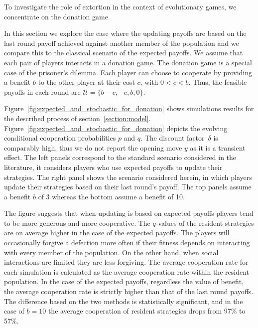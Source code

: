 \documentclass[11pt]{article}
\theoremstyle{plainCl1}
\theoremstyle{plainCl2}
\begin{document}
To investigate the role of extortion in the context of evolutionary games, we
concentrate on the donation game 

In this section we explore the case where the updating payoffs are based on the
last round payoff achieved against another member of the population and we
compare this to the classical scenario of the expected payoffs. We assume that
each pair of players interacts in a donation game. The donation game is a
special case of the prisoner's dilemma. Each player can choose to cooperate by
providing a benefit \(b\) to the other player at their cost \(c\), with \(0 < c
< b\). Thus, the feasible payoffs in each round are \(\mathcal{U} = \{b-c, -c,
b, 0\}\).

Figure~\ref{fig:expected_and_stochastic_for_donation} shows simulations results
for the described process of section~\ref{section:model}.
Figure~\ref{fig:expected_and_stochastic_for_donation} depicts the evolving
conditional cooperation probabilities $p$ and $q$. The discount factor~$\delta$
is comparably high, thus we do not report the opening move \(y\) as it is a
transient effect. The left panels correspond to the standard scenario considered
in the literature, it considers players who use expected payoffs to update their
strategies. The right panel shows the scenario considered herein, in which
players update their strategies based on their last round’s payoff. The top
panels assume a benefit \(b\) of 3 whereas the bottom assume a benefit of 10.

The figure suggests that when updating is based on expected payoffs players tend
to be more generous and more cooperative. The $q$-values of the resident
strategies are on average higher in the case of the expected payoffs. The
players will occasionally forgive a defection more often if their fitness
depends on interacting with every member of the population. On the other hand,
when social interactions are limited they are less forgiving. The average
cooperation rate for each simulation is calculated as the average cooperation
rate within the resident population. In the case of the expected payoffs,
regardless the value of benefit, the average cooperation rate is strictly higher
than that of the last round payoffs. The difference based on the two methods is
statistically significant, and in the case of $b=10$ the average cooperation of
resident strategies drops from 97\% to 57\%.
\end{document}
